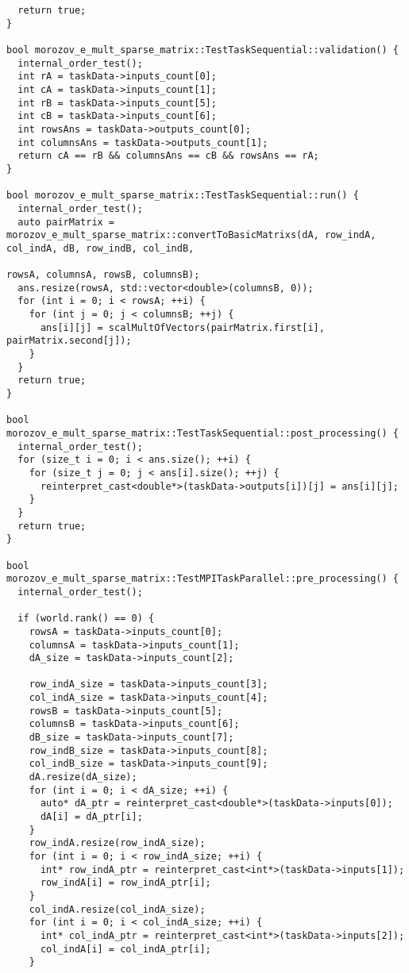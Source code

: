 \documentclass[a4paper,12pt]{article}
\begin{document}
\begin{lstlisting}
  return true;
}

bool morozov_e_mult_sparse_matrix::TestTaskSequential::validation() {
  internal_order_test();
  int rA = taskData->inputs_count[0];
  int cA = taskData->inputs_count[1];
  int rB = taskData->inputs_count[5];
  int cB = taskData->inputs_count[6];
  int rowsAns = taskData->outputs_count[0];
  int columnsAns = taskData->outputs_count[1];
  return cA == rB && columnsAns == cB && rowsAns == rA;
}

bool morozov_e_mult_sparse_matrix::TestTaskSequential::run() {
  internal_order_test();
  auto pairMatrix = morozov_e_mult_sparse_matrix::convertToBasicMatrixs(dA, row_indA, col_indA, dB, row_indB, col_indB,
                                                                        rowsA, columnsA, rowsB, columnsB);
  ans.resize(rowsA, std::vector<double>(columnsB, 0));
  for (int i = 0; i < rowsA; ++i) {
    for (int j = 0; j < columnsB; ++j) {
      ans[i][j] = scalMultOfVectors(pairMatrix.first[i], pairMatrix.second[j]);
    }
  }
  return true;
}

bool morozov_e_mult_sparse_matrix::TestTaskSequential::post_processing() {
  internal_order_test();
  for (size_t i = 0; i < ans.size(); ++i) {
    for (size_t j = 0; j < ans[i].size(); ++j) {
      reinterpret_cast<double*>(taskData->outputs[i])[j] = ans[i][j];
    }
  }
  return true;
}

bool morozov_e_mult_sparse_matrix::TestMPITaskParallel::pre_processing() {
  internal_order_test();

  if (world.rank() == 0) {
    rowsA = taskData->inputs_count[0];
    columnsA = taskData->inputs_count[1];
    dA_size = taskData->inputs_count[2];

    row_indA_size = taskData->inputs_count[3];
    col_indA_size = taskData->inputs_count[4];
    rowsB = taskData->inputs_count[5];
    columnsB = taskData->inputs_count[6];
    dB_size = taskData->inputs_count[7];
    row_indB_size = taskData->inputs_count[8];
    col_indB_size = taskData->inputs_count[9];
    dA.resize(dA_size);
    for (int i = 0; i < dA_size; ++i) {
      auto* dA_ptr = reinterpret_cast<double*>(taskData->inputs[0]);
      dA[i] = dA_ptr[i];
    }
    row_indA.resize(row_indA_size);
    for (int i = 0; i < row_indA_size; ++i) {
      int* row_indA_ptr = reinterpret_cast<int*>(taskData->inputs[1]);
      row_indA[i] = row_indA_ptr[i];
    }
    col_indA.resize(col_indA_size);
    for (int i = 0; i < col_indA_size; ++i) {
      int* col_indA_ptr = reinterpret_cast<int*>(taskData->inputs[2]);
      col_indA[i] = col_indA_ptr[i];
    }


\end{lstlisting}
\end{document}

